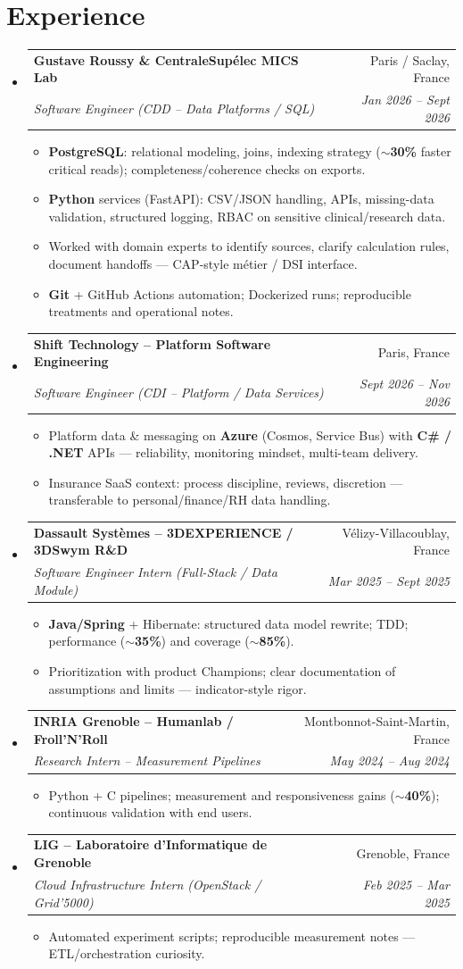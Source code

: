 \documentclass[letterpaper,10.5pt]{article}
\makeatletter
\newcommand{\resumeItem}[1]{\item\small{#1 \vspace{-1.5pt}}}
\newcommand{\resumeSubheading}[4]{\vspace{-1pt}\item\begin{tabular*}{0.97\textwidth}[t]{l@{\extracolsep{\fill}}r}\textbf{#1} & #2 \\\textit{\small#3} & \textit{\small #4} \\\end{tabular*}\vspace{-5pt}}
\newcommand{\resumeSubHeadingListStart}{\begin{itemize}[leftmargin=0.15in, label={}]}
\newcommand{\resumeSubHeadingListEnd}{\end{itemize}}
\newcommand{\resumeItemListStart}{\begin{itemize}[leftmargin=0.18in]}
\newcommand{\resumeItemListEnd}{\end{itemize}\vspace{-3pt}}
\makeatother
\begin{document}
\section{Experience}
\resumeSubHeadingListStart
  \resumeSubheading
    {Gustave Roussy \& CentraleSup\'elec MICS Lab}{Paris / Saclay, France}
    {Software Engineer (CDD -- Data Platforms / SQL)}{Jan 2026 -- Sept 2026}
    \resumeItemListStart
      \resumeItem{\textbf{PostgreSQL}: relational modeling, joins, indexing strategy (\textbf{$\sim$30\%} faster critical reads); completeness/coherence checks on exports.}
      \resumeItem{\textbf{Python} services (FastAPI): CSV/JSON handling, APIs, missing-data validation, structured logging, RBAC on sensitive clinical/research data.}
      \resumeItem{Worked with domain experts to identify sources, clarify calculation rules, document handoffs --- CAP-style m\'etier / DSI interface.}
      \resumeItem{\textbf{Git} + GitHub Actions automation; Dockerized runs; reproducible treatments and operational notes.}
    \resumeItemListEnd
  \resumeSubheading
    {Shift Technology -- Platform Software Engineering}{Paris, France}
    {Software Engineer (CDI -- Platform / Data Services)}{Sept 2026 -- Nov 2026}
    \resumeItemListStart
      \resumeItem{Platform data \& messaging on \textbf{Azure} (Cosmos, Service Bus) with \textbf{C\# / .NET} APIs --- reliability, monitoring mindset, multi-team delivery.}
      \resumeItem{Insurance SaaS context: process discipline, reviews, discretion --- transferable to personal/finance/RH data handling.}
    \resumeItemListEnd
  \resumeSubheading
    {Dassault Syst\`emes -- 3DEXPERIENCE / 3DSwym R\&D}{V\'elizy-Villacoublay, France}
    {Software Engineer Intern (Full-Stack / Data Module)}{Mar 2025 -- Sept 2025}
    \resumeItemListStart
      \resumeItem{\textbf{Java/Spring} + Hibernate: structured data model rewrite; TDD; performance (\textbf{$\sim$35\%}) and coverage (\textbf{$\sim$85\%}).}
      \resumeItem{Prioritization with product Champions; clear documentation of assumptions and limits --- indicator-style rigor.}
    \resumeItemListEnd
  \resumeSubheading
    {INRIA Grenoble -- Humanlab / Froll'N'Roll}{Montbonnot-Saint-Martin, France}
    {Research Intern -- Measurement Pipelines}{May 2024 -- Aug 2024}
    \resumeItemListStart
      \resumeItem{Python + C pipelines; measurement and responsiveness gains (\textbf{$\sim$40\%}); continuous validation with end users.}
    \resumeItemListEnd
  \resumeSubheading
    {LIG -- Laboratoire d'Informatique de Grenoble}{Grenoble, France}
    {Cloud Infrastructure Intern (OpenStack / Grid'5000)}{Feb 2025 -- Mar 2025}
    \resumeItemListStart
      \resumeItem{Automated experiment scripts; reproducible measurement notes --- ETL/orchestration curiosity.}
    \resumeItemListEnd
\resumeSubHeadingListEnd
\end{document}
